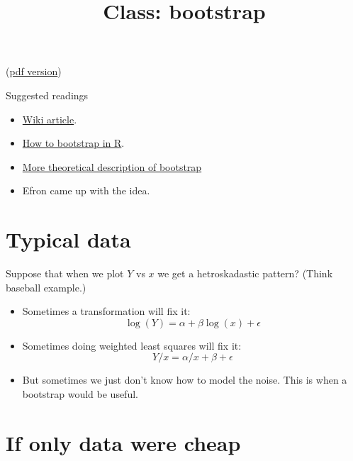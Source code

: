 \documentclass{article}
\begin{document}
\title{Class: bootstrap}

(\href{class_bootstrap.pdf}{pdf version})

Suggested readings
\begin{itemize}
\item \href{http://en.wikipedia.org/wiki/Bootstrapping_(statistics)}{Wiki article}.
\item \href{http://www.ats.ucla.edu/stat/R/library/bootstrap.htm}{How
to bootstrap in R}.
\item
\href{http://cran.r-project.org/doc/contrib/Fox-Companion/appendix-bootstrapping.pdf}{More
theoretical description of bootstrap} 
\item Efron came up with the idea.
\end{itemize}



\section{Typical data}

Suppose that when we plot $Y$ vs $x$ we get a hetroskadastic pattern?
(Think baseball example.)  
\begin{itemize}
\item Sometimes a transformation will fix it:
\begin{displaymath}
\log(Y) = \alpha + \beta \log(x) + \epsilon
\end{displaymath}
\item Sometimes doing weighted least squares will fix it:
\begin{displaymath}
Y/x = \alpha/x + \beta + \epsilon
\end{displaymath}
\item But sometimes we just don't know how to model the noise.  This
is when a bootstrap would be useful.
\end{itemize}

\section{If only data were cheap}
\end{document}
